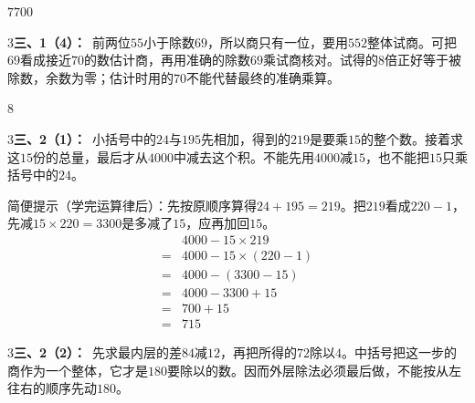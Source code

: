 \documentclass[multi=snippet,border={5bp 20bp 5bp 5bp}]{standalone}
\newenvironment{snippet}[3]{\begin{minipage}{#1bp}\color{answerred}\fontsize{#2}{#3}\selectfont\raggedright}{\end{minipage}}
\begin{document}
\begin{snippet}{27.0}{10.5}{14}\SourceSans\setlength{\mathindent}{2bp}\(7700\)\end{snippet}
\begin{snippet}{505}{11.5}{14}\begin{multicols}{3}\raggedcolumns \textbf{三、1（4）：}\ 前两位\(55\)\allowbreak 小于除数\(69\)\allowbreak ，所以商只有一位，要用\(552\)\allowbreak 整体试商。可把\(69\)\allowbreak 看成接近\(70\)\allowbreak 的数估计商，再用准确的除数\(69\)\allowbreak 乘试商核对。试得的\(8\)\allowbreak 倍正好等于被除数，余数为零；估计时用的\(70\)\allowbreak 不能代替最终的准确乘算。\end{multicols}\end{snippet}
\begin{snippet}{15.0}{10.5}{14}\SourceSans\setlength{\mathindent}{2bp}\(8\)\end{snippet}
\begin{snippet}{505}{11.5}{14}\begin{multicols}{3}\raggedcolumns \textbf{三、2（1）：}\ 小括号中的\(24\)\allowbreak 与\(195\)\allowbreak 先相加，得到的\(219\)\allowbreak 是要乘\(15\)\allowbreak 的整个数。接着求这\(15\)\allowbreak 份的总量，最后才从\(4000\)\allowbreak 中减去这个积。不能先用\(4000\)\allowbreak 减\(15\)\allowbreak ，也不能把\(15\)\allowbreak 只乘括号中的\(24\)\allowbreak 。\par 简便提示（学完运算律后）：先按原顺序算得\(24+195=219\)\allowbreak 。把\(219\)\allowbreak 看成\(220-1\)\allowbreak ，先减\(15\times220=3300\)\allowbreak 是多减了\(15\)\allowbreak ，应再加回\(15\)\allowbreak 。\[\begin{aligned}&4000-15\times219\\={}&4000-15\times(220-1)\\={}&4000-(3300-15)\\={}&4000-3300+15\\={}&700+15\\={}&715\end{aligned}\]\end{multicols}\end{snippet}
\begin{snippet}{505}{11.5}{14}\begin{multicols}{3}\raggedcolumns \textbf{三、2（2）：}\ 先求最内层的差\(84\)\allowbreak 减\(12\)\allowbreak ，再把所得的\(72\)\allowbreak 除以\(4\)\allowbreak 。中括号把这一步的商作为一个整体，它才是\(180\)\allowbreak 要除以的数。因而外层除法必须最后做，不能按从左往右的顺序先动\(180\)\allowbreak 。\end{multicols}\end{snippet}
\end{document}
